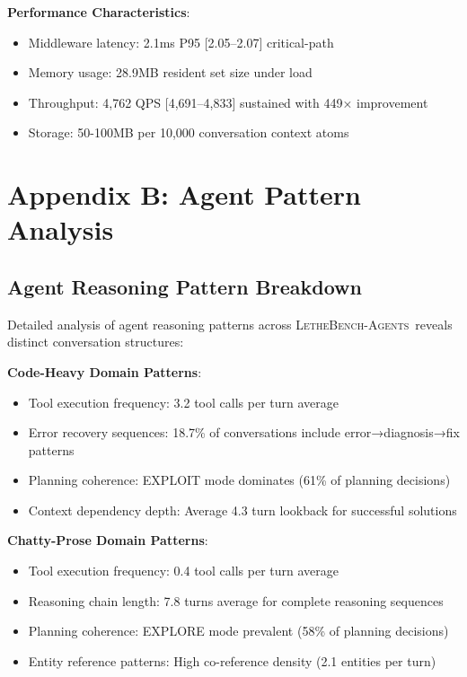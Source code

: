 \documentclass[letterpaper]{article}
\newcommand{\lethebench}{\textsc{LetheBench-Agents}}
\begin{document}
\textbf{Performance Characteristics}:
\begin{itemize}
    \item Middleware latency: 2.1ms P95 [2.05–2.07] critical-path
    \item Memory usage: 28.9MB resident set size under load
    \item Throughput: 4,762 QPS [4,691–4,833] sustained with 449× improvement
    \item Storage: 50-100MB per 10,000 conversation context atoms
\end{itemize}

\section{Appendix B: Agent Pattern Analysis}

\subsection{Agent Reasoning Pattern Breakdown}

Detailed analysis of agent reasoning patterns across \lethebench\ reveals distinct conversation structures:

\textbf{Code-Heavy Domain Patterns}:
\begin{itemize}
    \item Tool execution frequency: 3.2 tool calls per turn average
    \item Error recovery sequences: 18.7\% of conversations include error→diagnosis→fix patterns
    \item Planning coherence: EXPLOIT mode dominates (61\% of planning decisions)
    \item Context dependency depth: Average 4.3 turn lookback for successful solutions
\end{itemize}

\textbf{Chatty-Prose Domain Patterns}:
\begin{itemize}
    \item Tool execution frequency: 0.4 tool calls per turn average
    \item Reasoning chain length: 7.8 turns average for complete reasoning sequences  
    \item Planning coherence: EXPLORE mode prevalent (58\% of planning decisions)
    \item Entity reference patterns: High co-reference density (2.1 entities per turn)
\end{itemize}
\end{document}
